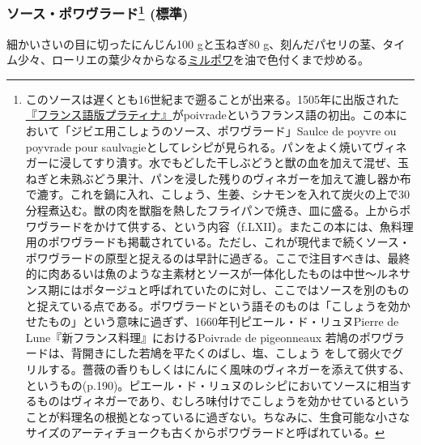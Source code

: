 \begin{recette}
\atoaki{}

\hypertarget{sauce-poivrade}{%
\subsubsection[ソース・ポワヴラード
(標準)]{\texorpdfstring{ソース・ポワヴラード\footnote{このソースは遅くとも16世紀まで遡ることが出来る。1505年に出版された\href{http://gallica.bnf.fr/ark:/12148/bpt6k792720}{『フランス語版プラティナ』}がpoivradeというフランス語の初出。この本において「ジビエ用こしょうのソース、ポワヴラード」Saulce
  de poyvre ou poyvrade pour
  saulvagieとしてレシピが見られる。パンをよく焼いてヴィネガーに浸してすり潰す。水でもどした干しぶどうと獣の血を加えて混ぜ、玉ねぎと未熟ぶどう果汁、パンを浸した残りのヴィネガーを加えて漉し器か布で漉す。これを鍋に入れ、こしょう、生姜、シナモンを入れて炭火の上で30分程煮込む。獣の肉を獣脂を熱したフライパンで焼き、皿に盛る。上からポワヴラードをかけて供する、という内容（f.LXII）。またこの本には、魚料理用のポワヴラードも掲載されている。ただし、これが現代まで続くソース・ポワヴラードの原型と捉えるのは早計に過ぎる。ここで注目すべきは、最終的に肉あるいは魚のような主素材とソースが一体化したものは中世〜ルネサンス期にはポタージュと呼ばれていたのに対し、ここではソースを別のものと捉えている点である。ポワヴラードという語そのものは「こしょうを効かせたもの」という意味に過ぎず、1660年刊ピエール・ド・リュヌPierre
  de Lune『新フランス料理』におけるPoivrade de pigeonneaux
  若鳩のポワヴラードは、背開きにした若鳩を平たくのばし、塩、こしょう
  をして弱火でグリルする。薔薇の香りもしくはにんにく風味のヴィネガーを添えて供する、というもの(p.190)。ピエール・ド・リュヌのレシピにおいてソースに相当するものはヴィネガーであり、むしろ味付けでこしょうを効かせているということが料理名の根拠となっているに過ぎない。ちなみに、生食可能な小さなサイズのアーティチョークも古くからポワヴラードと呼ばれている。}
(標準)}{ソース・ポワヴラード (標準)}}\label{sauce-poivrade}}



細かいさいの目に切ったにんじん100 gと玉ねぎ80
g、刻んだパセリの茎、タイム少々、ローリエの葉少々からなる\protect\hyperlink{mirepoix}{ミルポワ}を油で色付くまで炒める。


\end{recette}
